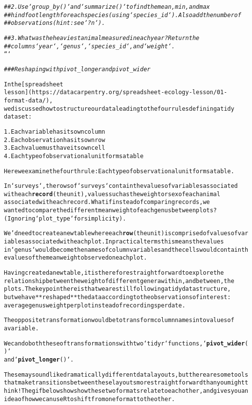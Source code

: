 \documentclass{article}\usepackage[]{graphicx}\usepackage[]{xcolor}
\makeatletter
\newcommand{\hlcom}[1]{\textcolor[rgb]{0.678,0.584,0.686}{\textit{#1}}}%
\newcommand{\hlkwd}[1]{\textcolor[rgb]{0.737,0.353,0.396}{\textbf{#1}}}%
\newenvironment{kframe}{%
 \def\at@end@of@kframe{}%
 \ifinner\ifhmode%
  \def\at@end@of@kframe{\end{minipage}}%
  \begin{minipage}{\columnwidth}%
 \fi\fi%
 \def\FrameCommand##1{\hskip\@totalleftmargin \hskip-\fboxsep
 \colorbox{shadecolor}{##1}\hskip-\fboxsep
     \hskip-\linewidth \hskip-\@totalleftmargin \hskip\columnwidth}%
 \MakeFramed {\advance\hsize-\width
   \@totalleftmargin\z@ \linewidth\hsize
   \@setminipage}}%
 {\par\unskip\endMakeFramed%
 \at@end@of@kframe}
\newenvironment{knitrout}{}{} %
\makeatother
\begin{document}
\begin{knitrout}
\begin{kframe}
\begin{alltt}
\hlcom{##  2. Use `group_by()` and `summarize()` to find the mean, min, and max}
\hlcom{## hindfoot length for each species (using `species_id`). Also add the number of}
\hlcom{## observations (hint: see `?n`).}

\hlcom{##  3. What was the heaviest animal measured in each year? Return the}
\hlcom{##  columns `year`, `genus`, `species_id`, and `weight`.}
```

\hlcom{### Reshaping with pivot_longer and pivot_wider}

In the [spreadsheet
lesson](https://datacarpentry.org/spreadsheet-ecology-lesson/01-format-data/),
we discussed how to structure our data leading to the four rules defining a tidy
dataset:

1. Each variable has its own column
2. Each observation has its own row
3. Each value must have its own cell
4. Each type of observational unit forms a table

Here we examine the fourth rule: Each type of observational unit forms a table.

In `surveys`, the rows of `surveys` contain the values of variables associated
with each \hlkwd{record} (the unit), values such as the weight or sex of each animal
associated with each record. What if instead of comparing records, we
wanted to compare the different mean weight of each genus between plots? (Ignoring `plot_type` for simplicity).

We'd need to create a new table where each \hlkwd{row} (the unit) is comprised of values of variables associated with each plot. In practical terms this means the values
in `genus` would become the names of column variables and the cells would contain the values of the mean weight observed on each plot.

Having created a new table, it is therefore straightforward to explore the
relationship between the weight of different genera within, and between, the
plots. The key point here is that we are still following a tidy data structure,
but we have **reshaped** the data according to the observations of interest:
average genus weight per plot instead of recordings per date.

The opposite transformation would be to transform column names into values of
a variable.

We can do both these of transformations with two `tidyr` functions, `\hlkwd{pivot_wider}()`
and `\hlkwd{pivot_longer}()`.

These may sound like dramatically different data layouts, but there are some tools that make transitions between these layouts more straightforward than you might think! The gif below shows how these two formats relate to each other, and gives you an idea of how we can use R to shift from one format to the other.


\end{alltt}
\end{kframe}
\end{knitrout}
\end{document}
